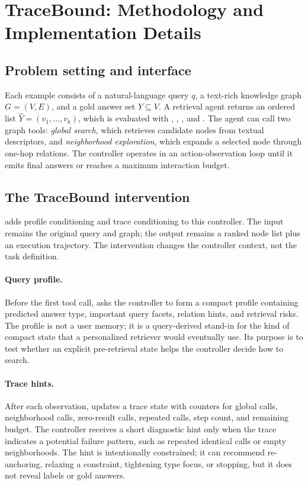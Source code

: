 \section{TraceBound: Methodology and Implementation Details}
\subsection{Problem setting and interface}
Each example consists of a natural-language query $q$, a text-rich knowledge graph $G=(V,E)$, and a gold answer set $Y \subseteq V$. A retrieval agent returns an ordered list $\hat{Y}=(v_1,\ldots,v_k)$, which is evaluated with , , , and \mrr. The agent can call two graph tools: \emph{global search}, which retrieves candidate nodes from textual descriptors, and \emph{neighborhood exploration}, which expands a selected node through one-hop relations. The controller operates in an action-observation loop until it emits final answers or reaches a maximum interaction budget.

\subsection{The TraceBound intervention}
\tb adds profile conditioning and trace conditioning to this controller. The input remains the original query and graph; the output remains a ranked node list plus an execution trajectory. The intervention changes the controller context, not the task definition.

\paragraph{Query profile.}
Before the first tool call, \tb asks the controller to form a compact profile containing predicted answer type, important query facets, relation hints, and retrieval risks. The profile is not a user memory; it is a query-derived stand-in for the kind of compact state that a personalized retriever would eventually use. Its purpose is to test whether an explicit pre-retrieval state helps the controller decide how to search.

\paragraph{Trace hints.}
After each observation, \tb updates a trace state with counters for global calls, neighborhood calls, zero-result calls, repeated calls, step count, and remaining budget. The controller receives a short diagnostic hint only when the trace indicates a potential failure pattern, such as repeated identical calls or empty neighborhoods. The hint is intentionally constrained; it can recommend re-anchoring, relaxing a constraint, tightening type focus, or stopping, but it does not reveal labels or gold answers.

